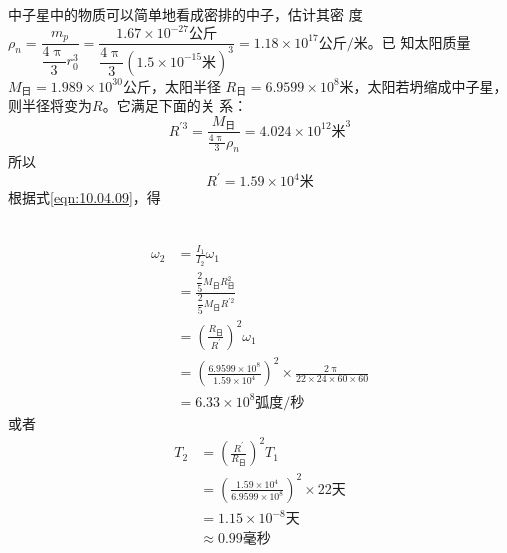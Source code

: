 \solution 中子星中的物质可以简单地看成密排的中子，估计其密
度
$ \rho _ { n } = \dfrac { m _ { p } } { \dfrac { 4 \uppi } { 3 } r _ 0 ^ { 3 } } = \dfrac { 1 . 6 7 \times 1 0 ^ { - 2 7 } \text{公斤} } { \dfrac { 4 \uppi } { 3 } \left( 1 . 5 \times 1 0 ^ { - 15 } \text{米} \right) ^ { 3 } } = 1 . 1 8 \times 1 0 ^ { 1 7 } \text{公斤/米} $。已
知太阳质量 $ M _ { \text{日} } = 1 . 9 8 9 \times 1 0 ^ { 3 0 }  \text{公斤} $，太阳半径 $ R _ { \text{日} } = 6 . 9 5 9 9 \times 1 0 ^ { 8 } \text{米} $，太阳若坍缩成中子星，则半径将变为$ R $。它满足下面的关
系：
\begin{equation*}
    R ^ { \prime 3 } = \frac { M _ { \text{日} } } { \frac { 4 \uppi } { 3 } \rho _ { n } }= 4 . 0 2 4 \times 1 0 ^ { 1 2 } \text{米} ^ 3
\end{equation*}
所以
\begin{equation*}
    R ^ { \prime } = 1 . 5 9 \times 1 0 ^ { 4 } \text{米}
\end{equation*}
根据式\eqref{eqn:10.04.09}，得

~\vspace{-1.56em}
\begin{equation*}
    \begin{split}
        \omega _ { 2 } &= \frac { I _ { 1 } } { I _ { 2 } } \omega _ { 1 } \\
        &= \frac { \dfrac { 2 } { 5 } M _ { \text {日} } R _  {\text{日}} ^2 } { \dfrac { 2 } { 5 } M _ { \text {日} } R ^ { \prime 2 } } \\
        &= \left( \frac { R _ { \text{日} } } { R ^ { \prime } } \right) ^ { 2 } \omega _ { 1 } \\
        &= \left( \frac { 6 . 9 5 9 9 \times 1 0 ^ { 8 } } { 1 . 5 9 \times 1 0 ^ { 4 } } \right) ^ { 2 } \times \frac { 2 \uppi } { 2 2 \times 2 4 \times 6 0 \times 6 0 } \\
        &= 6 . 3 3 \times 1 0 ^ { 8 } \text{弧度/秒}
    \end{split}
\end{equation*}
或者\vspace{-1.56em}
\begin{equation*}
    \begin{split}
        T _ { 2 } &= \left( \frac { R ^ { \prime } } { R _ { \text{日} } } \right) ^ { 2 } T _ { 1 } \\
        &= \left( \frac { 1 . 5 9 \times 1 0 ^ { 4 } } { 6 . 9 5 9 9 \times 1 0 ^ { 8 } } \right) ^ { 2 } \times 2 2 \text{天} \\
        &= 1 . 1 5 \times 1 0 ^ { - 8 }  \text{天} \\
        &\approx 0.99 \text{毫秒}
    \end{split}
\end{equation*}


